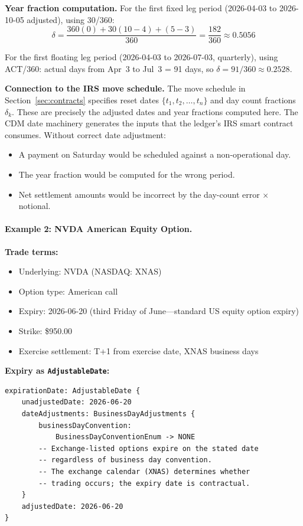 \documentclass[11pt,a4paper]{article}
\begin{document}
\smallskip
\noindent\textbf{Year fraction computation.} For the first fixed leg period (2026-04-03 to 2026-10-05 adjusted), using 30/360:
\[
\delta = \frac{360(0) + 30(10-4) + (5-3)}{360} = \frac{182}{360} \approx 0.5056
\]

\noindent For the first floating leg period (2026-04-03 to 2026-07-03, quarterly), using ACT/360: actual days from Apr~3 to Jul~3 = 91 days, so $\delta = 91/360 \approx 0.2528$.

\smallskip
\noindent\textbf{Connection to the IRS move schedule.} The move schedule in Section~\ref{sec:contracts} specifies reset dates $\{t_1, t_2, \ldots, t_n\}$ and day count fractions $\delta_k$. These are precisely the adjusted dates and year fractions computed here. The CDM date machinery generates the inputs that the ledger's IRS smart contract consumes. Without correct date adjustment:
\begin{itemize}[nosep]
\item A payment on Saturday would be scheduled against a non-operational day.
\item The year fraction would be computed for the wrong period.
\item Net settlement amounts would be incorrect by the day-count error $\times$ notional.
\end{itemize}

\paragraph{Example 2: NVDA American Equity Option.}

\smallskip
\noindent\textbf{Trade terms:}
\begin{itemize}[nosep]
\item Underlying: NVDA (NASDAQ: XNAS)
\item Option type: American call
\item Expiry: 2026-06-20 (third Friday of June---standard US equity option expiry)
\item Strike: \$950.00
\item Exercise settlement: T+1 from exercise date, XNAS business days
\end{itemize}

\smallskip
\noindent\textbf{Expiry as \texttt{AdjustableDate}:}

\begin{lstlisting}
expirationDate: AdjustableDate {
    unadjustedDate: 2026-06-20
    dateAdjustments: BusinessDayAdjustments {
        businessDayConvention:
            BusinessDayConventionEnum -> NONE
        -- Exchange-listed options expire on the stated date
        -- regardless of business day convention.
        -- The exchange calendar (XNAS) determines whether
        -- trading occurs; the expiry date is contractual.
    }
    adjustedDate: 2026-06-20
}
\end{lstlisting}
\end{document}
